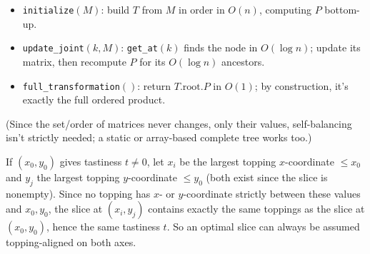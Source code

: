 \documentclass[12pt,twoside]{article}
\begin{document}
\begin{problems}
\begin{itemize}
\item \texttt{initialize}$(M)$: build $T$ from $M$ in order in $O(n)$,
    computing $P$ bottom-up.
\item \texttt{update\_joint}$(k,M)$: \texttt{get\_at}$(k)$ finds the
    node in $O(\log n)$; update its matrix, then recompute $P$ for its
    $O(\log n)$ ancestors.
\item \texttt{full\_transformation}$()$: return $T.\mathrm{root}.P$
    in $O(1)$; by construction, it's exactly the full ordered
    product.
\end{itemize}

(Since the set/order of matrices never changes, only their values,
self-balancing isn't strictly needed; a static or array-based
complete tree works too.)

\newpage
\problem  %

\begin{problemparts}

\problempart %
If $(x_0,y_0)$ gives tastiness $t \ne 0$, let $x_i$ be the largest
topping $x$-coordinate $\le x_0$ and $y_j$ the largest topping
$y$-coordinate $\le y_0$ (both exist since the slice is nonempty).
Since no topping has $x$- or $y$-coordinate strictly between these
values and $x_0,y_0$, the slice at $(x_i,y_j)$ contains exactly the
same toppings as the slice at $(x_0,y_0)$, hence the same tastiness
$t$. So an optimal slice can always be assumed topping-aligned on
both axes.


\end{problemparts}
\end{problems}
\end{document}

